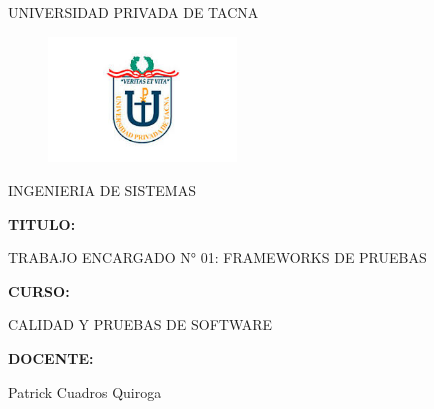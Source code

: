 \documentclass[twoside,twocolumn]{article}
\begin{document}
\begin{titlepage}
\begin{center}
\large{UNIVERSIDAD PRIVADA DE TACNA}\\
\vspace*{-0.025in}
\begin{figure}[htb]
\begin{center}
	\includegraphics[width=5cm]{./imagenes/logo.jpg} 
\end{center}
\end{figure}
\vspace*{0.15in}
INGENIERIA DE SISTEMAS  \\

\vspace*{0.5in}
\begin{large}
\textbf{TITULO:}\\
\end{large}

\vspace*{0.1in}
\begin{Large}
TRABAJO ENCARGADO N° 01: FRAMEWORKS DE PRUEBAS \\
\end{Large}

\vspace*{0.3in}
\begin{Large}
\textbf{CURSO:} \\
\end{Large}

\vspace*{0.1in}
\begin{large}
CALIDAD Y PRUEBAS DE SOFTWARE\\
\end{large}

\vspace*{0.3in}
\begin{Large}
\textbf{DOCENTE:} \\
\end{Large}

\vspace*{0.1in}
\begin{large}
 Patrick Cuadros Quiroga\\
\end{large}


\end{center}
\end{titlepage}
\end{document}
